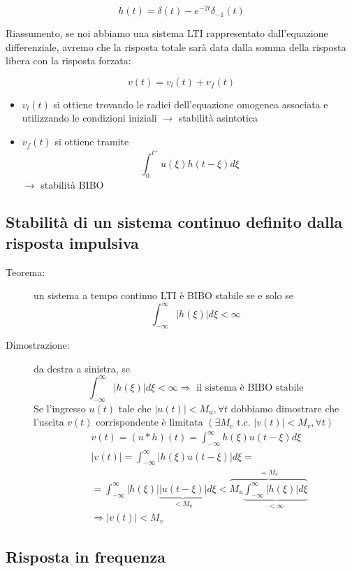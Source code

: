 \documentclass[a4paper, 12pt]{book}
\theoremstyle{plain}
\begin{document}
\[
    h(t) = \delta(t) - e^{-2t} \delta_{-1}(t)
\]

Riassumento, se noi abbiamo una sistema LTI rappresentato dall'equazione differenziale, avremo che la risposta totale sarà data dalla somma della risposta libera con la risposta forzata:

\[
    v(t) = v_l(t) + v_f(t)
\]

\begin{itemize}
    \item $v_l(t)$ si ottiene trovando le radici dell'equazione omogenea associata e utilizzando le condizioni iniziali $\rightarrow$ stabilità asintotica
    \item $v_f(t)$ si ottiene tramite \[\int_0^{t^+} u(\xi)h(t - \xi) d\xi\] $\rightarrow$ stabilità BIBO
\end{itemize}

\subsection{Stabilità di un sistema continuo definito dalla risposta impulsiva}

\begin{description}
    \item[Teorema:] un sistema a tempo continuo LTI è BIBO stabile se e solo se \[ \int_{-\infty}^\infty |h(\xi)|d\xi < \infty\]
    \item[Dimostrazione:] da destra a sinistra, se \[\int_{-\infty}^\infty |h(\xi)|d\xi < \infty \Rightarrow \textrm{ il sistema è BIBO stabile}\] Se l'ingresso $u(t)$ tale che $|u(t)| < M_u, \forall t$ dobbiamo dimostrare che l'uscita $v(t)$ corrispondente  è limitata $(\exists M_v \textrm{ t.c. } |v(t)| < M_v, \forall t)$ \[ \begin{split}
        &v(t) = (u \ast h)(t) = \int_{-\infty}^\infty h(\xi) u(t - \xi) d\xi \\
        &|v(t)| = \int_{-\infty}^\infty |h(\xi) u(t - \xi)| d\xi = \\
        &= \int_{-\infty}^{\infty} |h(\xi)|\underbrace{|u(t - \xi)|}_{< M_u} d\xi < \overbrace{M_u \underbrace{\int_{-\infty}^\infty|h(\xi)|d\xi}_{< \infty}}^{= M_v} \\
        &\Rightarrow |v(t)| < M_v
    \end{split} 
    \]
\end{description}

\subsection{Risposta in frequenza}
\end{document}

